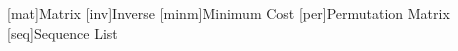 \begin{acronym}
	[mat]{Matrix}
	[inv]{Inverse}
	[minm]{Minimum Cost}
	[per]{Permutation Matrix}
	[seq]{Sequence List}
\end{acronym}